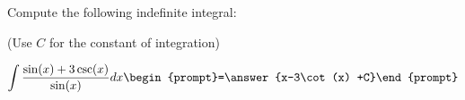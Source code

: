 \documentclass{ximera}
\author{Jim Talamo}
\begin{document}
\begin{exercise}
Compute the following indefinite integral:

\begin{prompt} (Use $C$ for the constant of integration) \end{prompt}

\[
\int \frac{\sin(x)+3\csc(x)}{\sin(x)}  dx 
\begin{prompt}=\answer{x-3\cot(x) +C}\end{prompt}
\]
\end{exercise}
\end{document}
